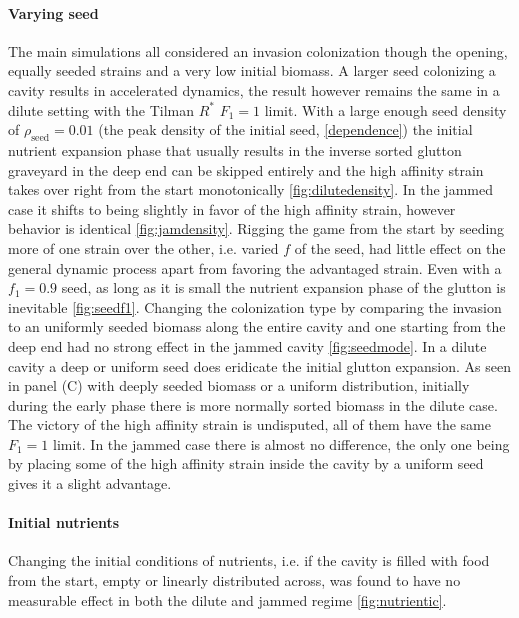 \documentclass[11pt,a4paper]{report}
\begin{document}
\paragraph{Varying seed}
The main simulations all considered an invasion colonization though the opening, equally seeded strains and a very low initial biomass. A larger seed colonizing a cavity results in accelerated dynamics, the result however remains the same in a dilute setting with the Tilman $R^*$ $F_1=1$ limit. With a large enough seed density of $\rho_{\mathrm{seed}}=0.01$ (the peak density of the initial seed, \cref{dependence}) the initial nutrient expansion phase that usually results in the inverse sorted glutton graveyard in the deep end can be skipped entirely and the high affinity strain takes over right from the start monotonically \ref{fig:dilutedensity}. In the jammed case it shifts to being slightly in favor of the high affinity strain, however behavior is identical \ref{fig:jamdensity}. Rigging the game from the start by seeding more of one strain over the other, i.e. varied $f$ of the seed, had little effect on the general dynamic process apart from favoring the advantaged strain. Even with a $f_1=0.9$ seed, as long as it is small the nutrient expansion phase of the glutton is inevitable \ref{fig:seedf1}. Changing the colonization type by comparing the invasion to an uniformly seeded biomass along the entire cavity and one starting from the deep end had no strong effect in the jammed cavity \ref{fig:seedmode}. In a dilute cavity a deep or uniform seed does eridicate the initial glutton expansion. As seen in panel (C) with deeply seeded biomass or a uniform distribution, initially during the early phase there is more normally sorted biomass in the dilute case. The victory of the high affinity strain is undisputed, all of them have the same $F_1=1$ limit. In the jammed case there is almost no difference, the only one being by placing some of the high affinity strain inside the cavity by a uniform seed gives it a slight advantage.
\paragraph{Initial nutrients}
Changing the initial conditions of nutrients, i.e. if the cavity is filled with food from the start, empty or linearly distributed across, was found to have no measurable effect in both the dilute and jammed regime \ref{fig:nutrientic}.
\end{document}
